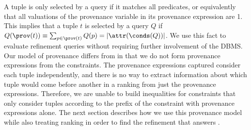 A tuple is only selected by a query if it matches all predicates, or equivalently that all valuations of the provenance variable in its provenance expression are 1. This implies that a tuple $t$ is selected by a query $Q$ if $Q(\prov(t)) \equiv \sum_{p \in \prov(t)} Q(p) = |\attr(\conds(Q))|$. We use this fact to evaluate refinement queries without requiring further involvement of the DBMS. Our model of provenance differs from \cite{MLJ22} in that we do not form provenance expressions from the constraints. The provenance expressions captured consider each tuple independently, and there is no way to extract information about which tuple would come before another in a ranking from just the provenance expressions. Therefore, we are unable to build inequalities for constraints that only consider tuples according to the prefix of the constraint with provenance expressions alone. The next section describes how we use this provenance model while also treating ranking in order to find the refinement that answers \problem{}.  
